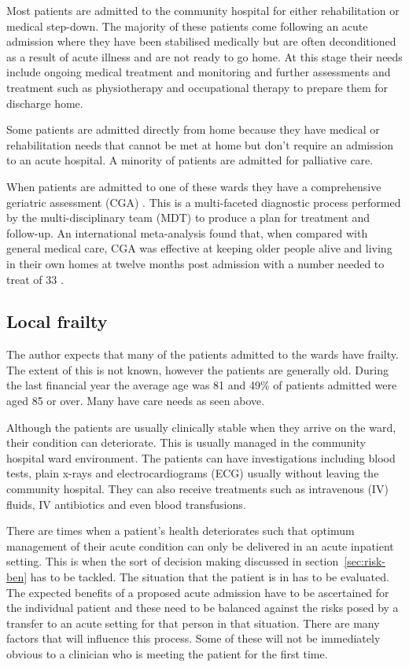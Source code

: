 \documentclass
[
	12pt,
	a4paper,
	oneside,
]{report}
\begin{document}
Most patients are admitted to the community hospital for either rehabilitation
or medical step-down. The majority of these patients come following an acute admission
where they have been stabilised medically but are often deconditioned as a result
of acute illness and are not ready to go home. At this stage their needs include 
ongoing medical treatment and monitoring and further assessments and treatment such 
as physiotherapy and occupational therapy to prepare them for discharge home.

Some patients are admitted directly from home because they have medical or rehabilitation
needs that cannot be met at home but don't require an admission to an acute hospital.
A minority of patients are admitted for palliative care.

When patients are admitted to one of these wards they have a comprehensive geriatric 
assessment (CGA) \parencite{bgs:14}. This is a multi-faceted diagnostic process
performed by the multi-disciplinary team (MDT) to produce a plan for treatment 
and follow-up.
An international meta-analysis found that, when compared with general medical care,
CGA was effective at keeping older people alive and living in their own homes at
twelve months post admission with a number needed to treat of 33 \parencite{ellis:11}.

\subsection{Local frailty}

The author expects that many of the patients admitted to the wards have frailty.
The extent of this is not known, however the patients are generally old.
During the last financial year the
average age was 81 and 49\% of patients admitted were aged 85 or over. Many have 
care needs as seen above.

Although the patients are usually clinically stable when they arrive on the ward,
their condition can deteriorate. This is usually managed in the community hospital
ward environment. The patients can have investigations including blood tests, plain
x-rays and electrocardiograms (ECG) usually without leaving the community hospital.
They can also receive treatments such as intravenous (IV) fluids, IV antibiotics
and even blood transfusions.

There are times when a patient's health deteriorates such that optimum 
management of their
acute condition can only be delivered in an acute inpatient setting. This is when 
the sort of decision making discussed in section~\ref{sec:risk-ben} has
to be tackled. The situation that the patient is in has to be evaluated. The 
expected benefits of a proposed acute admission have to be ascertained for the
individual patient and these need to be balanced against the risks posed by a transfer
to an acute setting for that person in that situation. There are many factors that 
will influence this process. Some of these will not be immediately obvious to a 
clinician who is meeting the patient for the first time.
\end{document}
